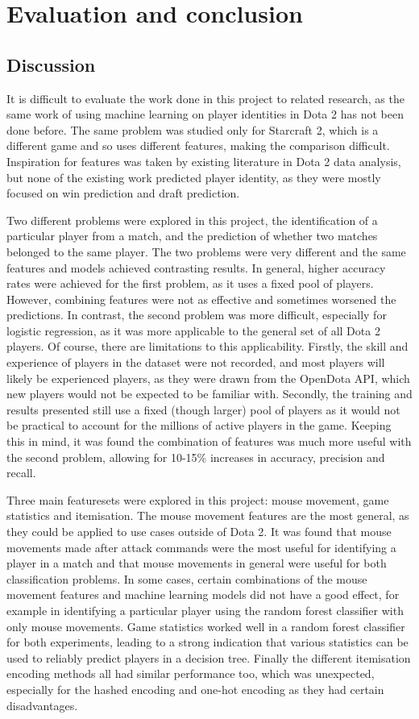 \documentclass[Report.tex]{subfiles}
\begin{document}
\section{Evaluation and conclusion}

\subsection{Discussion}
It is difficult to evaluate the work done in this project to related research, as the same work of using machine learning on player identities in Dota 2 has not been done before. The same problem was studied only for Starcraft 2, which is a different game and so uses different features, making the comparison difficult. Inspiration for features was taken by existing literature in Dota 2 data analysis, but none of the existing work predicted player identity, as they were mostly focused on win prediction and draft prediction. 

Two different problems were explored in this project, the identification of a particular player from a match, and the prediction of whether two matches belonged to the same player. The two problems were very different and the same features and models achieved contrasting results. In general, higher accuracy rates were achieved for the first problem, as it uses a fixed pool of players. However, combining features were not as effective and sometimes worsened the predictions. In contrast, the second problem was more difficult, especially for logistic regression, as it was more applicable to the general set of all Dota 2 players. Of course, there are limitations to this applicability. Firstly, the skill and experience of players in the dataset were not recorded, and most players will likely be experienced players, as they were drawn from the OpenDota API, which new players would not be expected to be familiar with. Secondly, the training and results presented still use a fixed (though larger) pool of players as it would not be practical to account for the millions of active players in the game. Keeping this in mind, it was found the combination of features was much more useful with the second problem, allowing for 10-15\% increases in accuracy, precision and recall. 

Three main featuresets were explored in this project: mouse movement, game statistics and itemisation. The mouse movement features are the most general, as they could be applied to use cases outside of Dota 2. It was found that mouse movements made after attack commands were the most useful for identifying a player in a match and that mouse movements in general were useful for both classification problems. In some cases, certain combinations of the mouse movement features and machine learning models did not have a good effect, for example in identifying a particular player using the random forest classifier with only mouse movements. Game statistics worked well in a random forest classifier for both experiments, leading to a strong indication that various statistics can be used to reliably predict players in a decision tree. Finally the different itemisation encoding methods all had similar performance too, which was unexpected, especially for the hashed encoding and one-hot encoding as they had certain disadvantages.
\end{document}
